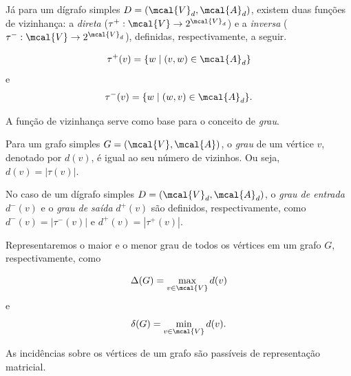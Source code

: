 Já para um dígrafo simples $D = (\mcal{V}_d, \mcal{A}_d)$, existem duas funções de vizinhança: a \emph{direta} ($\tau^+ : \mcal{V} \rightarrow 2^{\mcal{V}_d}$) e a \emph{inversa} ($\tau^- : \mcal{V} \rightarrow 2^{\mcal{V}_d}$), definidas, respectivamente, a seguir.

\begin{equation}
    \tau^+(v) = \{w \mid (v, w) \in \mcal{A}_d\}
\end{equation}
e
\begin{equation}
    \tau^-(v) = \{w \mid (w, v) \in \mcal{A}_d\}.
\end{equation}

A função de vizinhança serve como base para o conceito de \emph{grau}.

\begin{mydef}
    Para um grafo simples $G = (\mcal{V}, \mcal{A})$, o \emph{grau} de um vértice $v$, denotado por $d(v)$, é igual ao seu número de vizinhos. Ou seja, $d(v) = |\tau(v)|$.

    No caso de um dígrafo simples $D = (\mcal{V}_d, \mcal{A}_d)$, o \emph{grau de entrada} $d^-(v)$ e o \emph{grau de saída} $d^+(v)$ são definidos, respectivamente, como $d^-(v) = |\tau^-(v)|$ e $d^+(v) = |\tau^+(v)|$.
\end{mydef}

Representaremos o maior e o menor grau de todos os vértices em um grafo $G$, respectivamente, como

\begin{equation}
    \Delta(G) = \max_{v \in \mcal{V}} d(v)
\end{equation}
e
\begin{equation}
    \delta(G) = \min_{v \in \mcal{V}} d(v).
\end{equation}

As incidências sobre os vértices de um grafo são passíveis de representação matricial.

